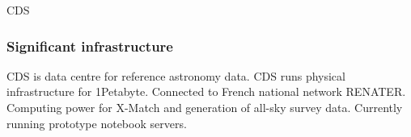 \begin{sitedescription}{CDS}
\subsubsection*{Significant infrastructure}

CDS is data centre for reference astronomy data. CDS runs physical infrastructure for 1Petabyte. Connected to French national network RENATER. Computing power for X-Match and generation of all-sky survey data. Currently running prototype notebook servers.


\end{sitedescription}
